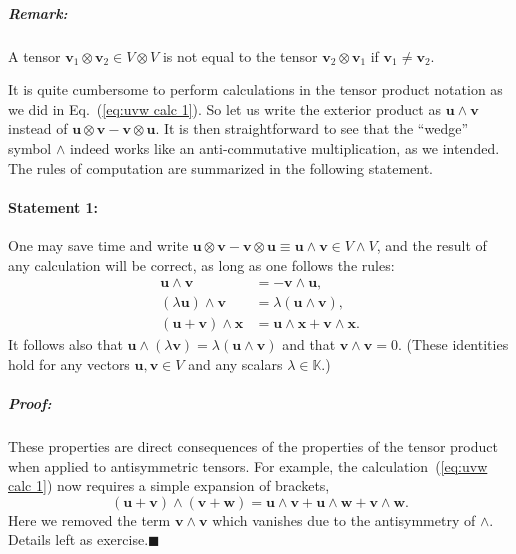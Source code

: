 \subparagraph{Remark:}

A tensor $\mathbf{v}_{1}\otimes\mathbf{v}_{2}\in V\otimes V$ is not
equal to the tensor $\mathbf{v}_{2}\otimes\mathbf{v}_{1}$ if $\mathbf{v}_{1}\neq\mathbf{v}_{2}$.




It is quite cumbersome to perform calculations in the tensor product
notation as we did in Eq.~(\ref{eq:uvw calc 1}). So let us write
the exterior product as $\mathbf{u}\wedge\mathbf{v}$ instead of $\mathbf{u}\otimes\mathbf{v}-\mathbf{v}\otimes\mathbf{u}$.
It is then straightforward to see that the {}``wedge'' symbol $\wedge$
indeed works like an anti-commutative multiplication, as we intended.
The rules of computation are summarized in the following statement.


\paragraph{Statement 1:}

One may save time and write $\mathbf{u}\otimes\mathbf{v}-\mathbf{v}\otimes\mathbf{u}\equiv\mathbf{u}\wedge\mathbf{v}\in V\wedge V$,
and the result of any calculation will be correct, as long as one
follows the rules:\begin{align}
\mathbf{u}\wedge\mathbf{v} & =-\mathbf{v}\wedge\mathbf{u},\label{eq:uv antisymm}\\
\left(\lambda\mathbf{u}\right)\wedge\mathbf{v} & =\lambda\left(\mathbf{u}\wedge\mathbf{v}\right),\\
\left(\mathbf{u}+\mathbf{v}\right)\wedge\mathbf{x} & =\mathbf{u}\wedge\mathbf{x}+\mathbf{v}\wedge\mathbf{x}.\label{eq:uv distrib}\end{align}
It follows also that $\mathbf{u}\wedge\left(\lambda\mathbf{v}\right)=\lambda\left(\mathbf{u}\wedge\mathbf{v}\right)$
and that $\mathbf{v}\wedge\mathbf{v}=0$. (These identities hold for
any vectors $\mathbf{u},\mathbf{v}\in V$ and any scalars $\lambda\in\mathbb{K}$.)


\subparagraph{Proof:}

These properties are direct consequences of the properties of the tensor
product when applied to antisymmetric tensors. For example, the calculation~(\ref{eq:uvw calc 1})
now requires a simple expansion of brackets,\[
\left(\mathbf{u}+\mathbf{v}\right)\wedge\left(\mathbf{v}+\mathbf{w}\right)=\mathbf{u}\wedge\mathbf{v}+\mathbf{u}\wedge\mathbf{w}+\mathbf{v}\wedge\mathbf{w}.\]
Here we removed the term $\mathbf{v}\wedge\mathbf{v}$ which vanishes
due to the antisymmetry of $\wedge$. Details left as exercise.\hfill{}$\blacksquare$

